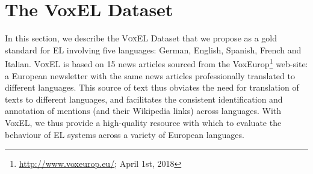 \documentclass{llncs}
\begin{document}





\section{The VoxEL Dataset} \label{sec:voxel}

In this section, we describe the \textsc{VoxEL} Dataset that we propose as a gold standard for EL involving five languages: German, English, Spanish, French and Italian. \textsc{VoxEL} is based on 15 news articles sourced from the VoxEurop\footnote{\url{http://www.voxeurop.eu/}; April 1st, 2018} web-site: a European newsletter with the same news articles professionally translated to different languages. This source of text thus obviates the need for translation of texts to different languages, and facilitates the consistent identification and annotation of mentions (and their Wikipedia links) across languages. With VoxEL, we thus provide a high-quality resource with which to evaluate the behaviour of EL systems across a variety of European languages. 
\end{document}
